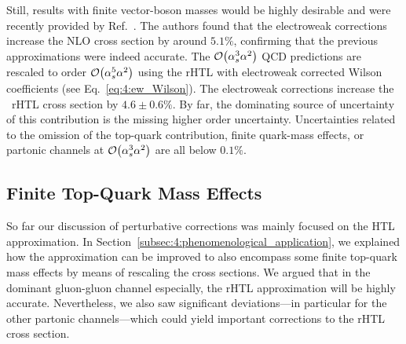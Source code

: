 Still, results with finite vector-boson masses would be highly desirable and were recently provided by Ref.~\cite{Becchetti:2020wof}. The authors found that the electroweak corrections increase the \acs{NLO} cross section by around $5.1\%$, confirming that the previous approximations were indeed accurate. The $\mathcal{O}\!\left(\alpha_s^3 \alpha^2\right)$ QCD predictions are rescaled to order $\mathcal{O}\!\left(\alpha_s^5 \alpha^2\right)$ using the \acs{rHTL} with electroweak corrected Wilson coefficients (see Eq.~\eqref{eq:4:ew_Wilson}). The electroweak corrections increase the \NNNLO\ \acs{rHTL} cross section by $4.6 \pm 0.6\%$. By far, the dominating source of uncertainty of this contribution is the missing higher order uncertainty. Uncertainties related to the omission of the top-quark contribution, finite quark-mass effects, or partonic channels at $\mathcal{O}\!\left(\alpha_s^3 \alpha^2\right)$ are all below $0.1\%$.

\subsection{Finite Top-Quark Mass Effects}
So far our discussion of perturbative corrections was mainly focused on the \acs{HTL} approximation. In Section~\ref{subsec:4:phenomenological_application}, we explained how the approximation can be improved to also encompass some finite top-quark mass effects by means of rescaling the cross sections. We argued that in the dominant gluon-gluon channel especially, the \acs{rHTL} approximation will be highly accurate. Nevertheless, we also saw significant deviations---in particular for the other partonic channels---which could yield important corrections to the \acs{rHTL} cross section.

